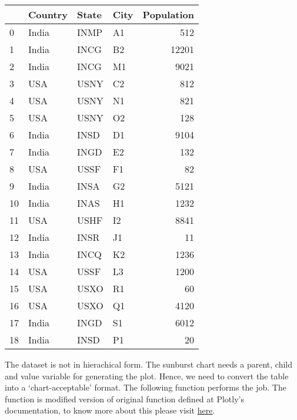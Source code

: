 \documentclass[
  letterpaper,
  DIV=11,
  numbers=noendperiod]{scrartcl}
\begin{document}
\begin{tabular}{llllr}
\toprule
{} & Country & State & City &  Population \\
\midrule
0  &   India &  INMP &   A1 &         512 \\
1  &   India &  INCG &   B2 &       12201 \\
2  &   India &  INCG &   M1 &        9021 \\
3  &     USA &  USNY &   C2 &         812 \\
4  &     USA &  USNY &   N1 &         821 \\
5  &     USA &  USNY &   O2 &         128 \\
6  &   India &  INSD &   D1 &        9104 \\
7  &   India &  INGD &   E2 &         132 \\
8  &     USA &  USSF &   F1 &          82 \\
9  &   India &  INSA &   G2 &        5121 \\
10 &   India &  INAS &   H1 &        1232 \\
11 &     USA &  USHF &   I2 &        8841 \\
12 &   India &  INSR &   J1 &          11 \\
13 &   India &  INCQ &   K2 &        1236 \\
14 &     USA &  USSF &   L3 &        1200 \\
15 &     USA &  USXO &   R1 &          60 \\
16 &     USA &  USXO &   Q1 &        4120 \\
17 &   India &  INGD &   S1 &        6012 \\
18 &   India &  INSD &   P1 &          20 \\
\bottomrule
\end{tabular}

The dataset is not in hierachical form. The sunburst chart needs a
parent, child and value variable for generating the plot. Hence, we need
to convert the table into a `chart-acceptable' format. The following
function performs the job. The function is modified version of original
function defined at Plotly's documentation, to know more about this
please visit
\href{https://plotly.com/python/sunburst-charts/\#:~:text=Charred-,Sunburst\%20chart\%20with\%20a\%20continuous\%20colorscale,-The\%20example\%20below}{here}.
\end{document}
